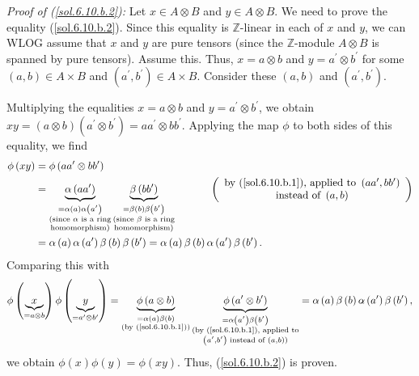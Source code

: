 \documentclass[numbers=enddot,12pt,final,onecolumn,notitlepage]{scrartcl}%
\begin{document}
\textit{Proof of (\ref{sol.6.10.b.2}):} Let $x\in A\otimes B$ and $y\in
A\otimes B$. We need to prove the equality (\ref{sol.6.10.b.2}). Since this
equality is $\mathbb{Z}$-linear in each of $x$ and $y$, we can WLOG assume
that $x$ and $y$ are pure tensors (since the $\mathbb{Z}$-module $A\otimes B$
is spanned by pure tensors). Assume this. Thus, $x=a\otimes b$ and
$y=a^{\prime}\otimes b^{\prime}$ for some $\left(  a,b\right)  \in A\times B$
and $\left(  a^{\prime},b^{\prime}\right)  \in A\times B$. Consider these
$\left(  a,b\right)  $ and $\left(  a^{\prime},b^{\prime}\right)  $.

Multiplying the equalities $x=a\otimes b$ and $y=a^{\prime}\otimes b^{\prime}%
$, we obtain $xy=\left(  a\otimes b\right)  \left(  a^{\prime}\otimes
b^{\prime}\right)  =aa^{\prime}\otimes bb^{\prime}$. Applying the map $\phi$
to both sides of this equality, we find%
\begin{align*}
\phi\left(  xy\right)   &  =\phi\left(  aa^{\prime}\otimes bb^{\prime}\right)
\\
&  =\underbrace{\alpha\left(  aa^{\prime}\right)  }_{\substack{=\alpha\left(
a\right)  \alpha\left(  a^{\prime}\right)  \\\text{(since }\alpha\text{ is a
ring}\\\text{homomorphism)}}}\underbrace{\beta\left(  bb^{\prime}\right)
}_{\substack{=\beta\left(  b\right)  \beta\left(  b^{\prime}\right)
\\\text{(since }\beta\text{ is a ring}\\\text{homomorphism)}}%
}\ \ \ \ \ \ \ \ \ \ \left(
\begin{array}
[c]{c}%
\text{by (\ref{sol.6.10.b.1}), applied to }\left(  aa^{\prime},bb^{\prime
}\right) \\
\text{instead of }\left(  a,b\right)
\end{array}
\right) \\
&  =\alpha\left(  a\right)  \alpha\left(  a^{\prime}\right)  \beta\left(
b\right)  \beta\left(  b^{\prime}\right)  =\alpha\left(  a\right)
\beta\left(  b\right)  \alpha\left(  a^{\prime}\right)  \beta\left(
b^{\prime}\right)  .
\end{align*}
Comparing this with%
\[
\phi\left(  \underbrace{x}_{=a\otimes b}\right)  \phi\left(  \underbrace{y}%
_{=a^{\prime}\otimes b^{\prime}}\right)  =\underbrace{\phi\left(  a\otimes
b\right)  }_{\substack{=\alpha\left(  a\right)  \beta\left(  b\right)
\\\text{(by (\ref{sol.6.10.b.1}))}}}\underbrace{\phi\left(  a^{\prime}\otimes
b^{\prime}\right)  }_{\substack{=\alpha\left(  a^{\prime}\right)  \beta\left(
b^{\prime}\right)  \\\text{(by (\ref{sol.6.10.b.1}), applied to}\\\left(
a^{\prime},b^{\prime}\right)  \text{ instead of }\left(  a,b\right)  \text{)}%
}}=\alpha\left(  a\right)  \beta\left(  b\right)  \alpha\left(  a^{\prime
}\right)  \beta\left(  b^{\prime}\right)  ,
\]
we obtain $\phi\left(  x\right)  \phi\left(  y\right)  =\phi\left(  xy\right)
$. Thus, (\ref{sol.6.10.b.2}) is proven.
\end{document}
